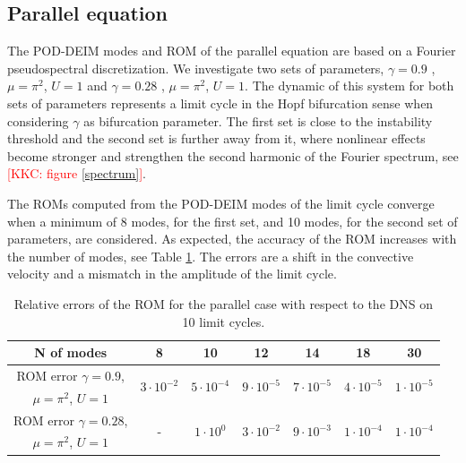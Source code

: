 \documentclass[11pt]{article}
\newcommand{\kkc}[1]{\textcolor{red}{[KKC: #1]}}
\begin{document}
\subsection{Parallel equation}
\label{subsec:parallel}
The POD-DEIM modes and ROM of the parallel equation are based on a Fourier pseudospectral discretization. We investigate two sets of parameters, $\gamma = 0.9$ , $\mu=\pi^2$, $U=1$ and $\gamma = 0.28$ , $\mu=\pi^2$, $U=1$. The dynamic of this system for both sets of parameters represents a limit cycle in the Hopf bifurcation sense when considering $\gamma$ as bifurcation parameter. The first set is close to the instability threshold and the second set is further away from it, where nonlinear effects become stronger and strengthen the second harmonic of the Fourier spectrum, see \kkc{figure \ref{spectrum}}.

The ROMs computed from the POD-DEIM modes of the limit cycle converge when a minimum of 8 modes, for the first set, and 10 modes, for the second set of parameters, are considered. As expected, the accuracy of the ROM increases with the number of modes, see Table \ref{tab:errorcycle}. The errors are a shift in the convective velocity and a mismatch in the amplitude of the limit cycle. 

\begin{table}[!ht]
\begin{center}
\begin{tabular}{ c || c | c | c | c | c |c|}
 N of modes &  8 & 10 & 12 & 14 & 18 &30\\ \hline
ROM error $\gamma=0.9$, &  \multirow{2}{*}{$3\cdot 10^{-2}$} & \multirow{2}{*}{$5\cdot 10^{-4}$} & \multirow{2}{*}{$9\cdot 10^{-5}$} & \multirow{2}{*}{$7\cdot 10^{-5}$}& \multirow{2}{*}{$4\cdot 10^{-5}$}& \multirow{2}{*}{$1\cdot 10^{-5}$}\\
 $\mu = \pi^2$, $ U = 1$ & & & & && \\ \hline
ROM error $\gamma=0.28$, & \multirow{2}{*}{-}  & \multirow{2}{*}{$1\cdot 10^{0}$}  & \multirow{2}{*}{$3\cdot 10^{-2}$}  & \multirow{2}{*}{$9\cdot 10^{-3}$}& \multirow{2}{*}{$1\cdot 10^{-4}$}& \multirow{2}{*}{$1\cdot 10^{-4}$} \\
 $\mu = \pi^2$, $ U = 1$ & & & & &&\\
\hline
\end{tabular}
\caption{Relative errors of the ROM for the parallel case with respect to the DNS on 10 limit cycles.\label{tab:errorcycle}}
\end{center}
\end{table}
\end{document}
